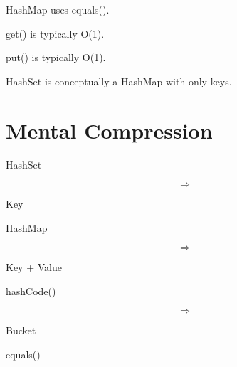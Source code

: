 \documentclass[11pt,a4paper]{book}
\begin{document}

\begin{rosettarule}

HashMap uses equals().

\end{rosettarule}


\begin{rosettarule}

get() is typically O(1).

\end{rosettarule}


\begin{rosettarule}

put() is typically O(1).

\end{rosettarule}


\begin{rosettarule}

HashSet is conceptually
a HashMap with only keys.

\end{rosettarule}


\section{Mental Compression}

HashSet

\[
\Rightarrow
\]

Key


HashMap

\[
\Rightarrow
\]

Key + Value


hashCode()

\[
\Rightarrow
\]

Bucket


equals()
\end{document}
